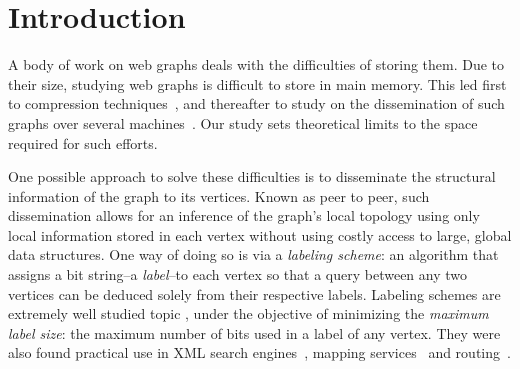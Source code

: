 

\section{Introduction}
A body of work on web graphs deals with the difficulties of storing them. 
Due to their size, studying web graphs is difficult to store in main memory. This led first to compression techniques~\cite{boldi2004webgraph,boldi2011layered}, and thereafter to study on the dissemination  of such graphs over several machines~\cite{gonzalez2012powergraph}. Our study sets theoretical limits to the space required for such  efforts.

One possible approach to solve these difficulties is to disseminate the structural information of the graph to its vertices. Known as peer to peer, such dissemination allows for an inference of the graph's local topology  using only local information stored in each vertex without using costly access to large, global data structures.
One way of doing so is via a \emph{ labeling scheme}: an algorithm that assigns a bit string--a \emph{label}--to each vertex so that a query between any two vertices can be deduced solely from their respective labels. 
Labeling schemes are extremely well studied topic \cite{}, under the objective of  minimizing the \emph{maximum label size}: the maximum number of bits used in a label of any vertex. They were also found practical use in  XML search engines~\cite{cohen2010labeling}, mapping services~\cite{abraham2011hub} and routing~\cite{krioukov2004compact}.

